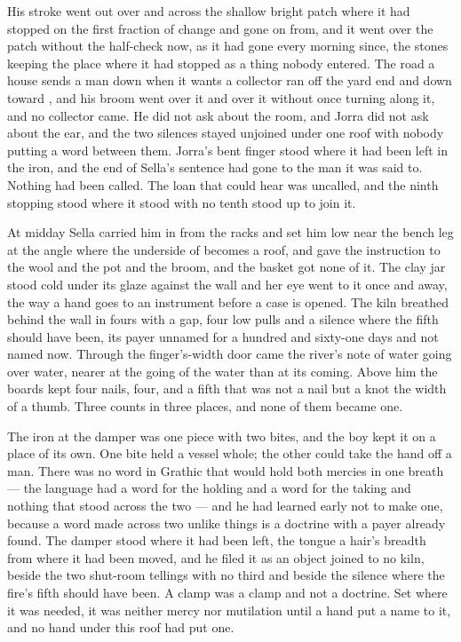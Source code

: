 His stroke went out over  and across the shallow bright patch where it had stopped on the first fraction of change and gone on from, and it went over the patch without the half-check now, as it had gone every morning since, the stones keeping the place where it had stopped as a thing nobody entered. The road a house sends a man down when it wants a collector ran off the yard end and down toward , and his broom went over it and over it without once turning along it, and no collector came. He did not ask about the room, and Jorra did not ask about the ear, and the two silences stayed unjoined under one roof with nobody putting a word between them. Jorra's bent finger stood where it had been left in the iron, and the end of Sella's sentence had gone to the man it was said to. Nothing had been called. The loan that could hear was uncalled, and the ninth stopping stood where it stood with no tenth stood up to join it.

\scenebreak

At midday Sella carried him in from the racks and set him low near the bench leg at the angle where the underside of  becomes a roof, and gave the instruction to the wool and the pot and the broom, and the basket got none of it. The clay jar stood cold under its glaze against the wall and her eye went to it once and away, the way a hand goes to an instrument before a case is opened. The kiln breathed behind the wall in fours with a gap, four low pulls and a silence where the fifth should have been, its payer unnamed for a hundred and sixty-one days and not named now. Through the finger's-width door came the river's note of water going over water, nearer at the going of the water than at its coming. Above him the boards kept four nails, four, and a fifth that was not a nail but a knot the width of a thumb. Three counts in three places, and none of them became one.

The iron at the damper was one piece with two bites, and the boy kept it on a place of its own. One bite held a vessel whole; the other could take the hand off a man. There was no word in Grathic that would hold both mercies in one breath --- the language had a word for the holding and a word for the taking and nothing that stood across the two --- and he had learned early not to make one, because a word made across two unlike things is a doctrine with a payer already found. The damper stood where it had been left, the tongue a hair's breadth from where it had been moved, and he filed it as an object joined to no kiln, beside the two shut-room tellings with no third and beside the silence where the fire's fifth should have been. A clamp was a clamp and not a doctrine. Set where it was needed, it was neither mercy nor mutilation until a hand put a name to it, and no hand under this roof had put one.

